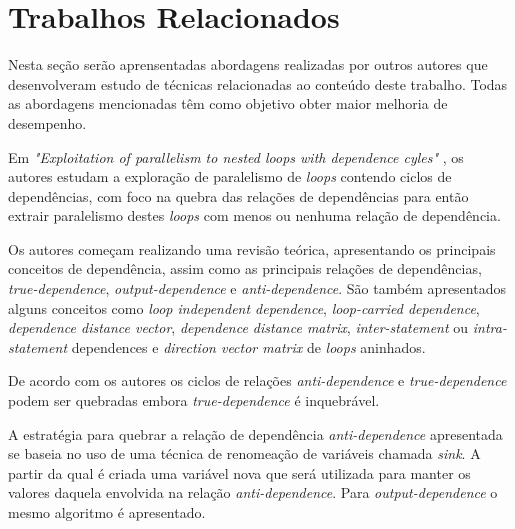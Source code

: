 
\section{Trabalhos Relacionados}

Nesta seção serão aprensentadas abordagens realizadas por outros autores que 
desenvolveram estudo de técnicas relacionadas ao conteúdo deste trabalho.
Todas as abordagens mencionadas têm como objetivo obter maior melhoria de 
desempenho.




Em \textit{"Exploitation of parallelism to nested loops with dependence
cyles"} \cite{Chang:2004}, os autores estudam a exploração de paralelismo de
\textit{loops} contendo ciclos de dependências, com foco na quebra das relações 
de dependências para então extrair paralelismo destes \textit{loops} com menos
ou nenhuma relação de dependência.

Os autores começam realizando uma revisão teórica, apresentando os principais
conceitos de dependência, assim como as principais relações de dependências, 
\textit{true-dependence}, \textit{output-dependence} e \textit{anti-dependence}.  
São também apresentados alguns conceitos como \textit{loop independent dependence}, 
\textit{loop-carried dependence}, \textit{dependence distance vector}, 
\textit{dependence distance matrix}, \textit{inter-statement} ou
\textit{intra-statement} dependences e \textit{direction vector matrix} de
\textit{loops} aninhados.

De acordo com os autores os ciclos de relações \textit{anti-dependence} e
\textit{true-dependence} podem ser quebradas embora \textit{true-dependence} é 
inquebrável.

A estratégia para quebrar a relação de dependência \textit{anti-dependence}
apresentada se baseia no uso de uma técnica de renomeação de variáveis
chamada \textit{sink}. 
A partir da qual é criada uma variável nova que será utilizada para manter os
valores daquela envolvida na relação \textit{anti-dependence}.  
Para \textit{output-dependence} o mesmo algoritmo é apresentado.

